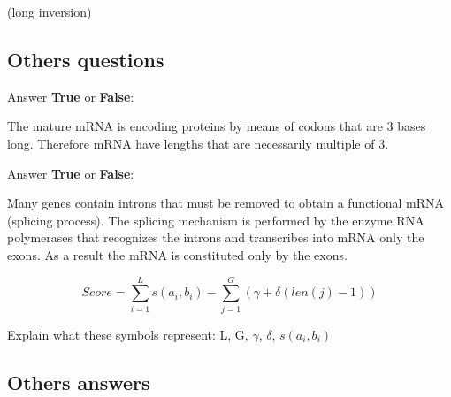 \begin{Answer} [
   ref={ex19},
   number={19}
 ]

   (long inversion)

\end{Answer}

\subsection{Others questions}

\begin{Exercise} [
  title={mRNA},
  difficulty={1},
  label={ex20},
  origin={G. Valle}
 ]

Answer \textbf{True} or \textbf{False}:

  \Question The mature mRNA is encoding proteins by means of codons that are
3 bases long. Therefore mRNA have lengths that are necessarily multiple of 3.

\end{Exercise}

\begin{Exercise} [
  title={Splicing},
  difficulty={1},
  label={ex21},
  origin={G. Valle}
 ]

Answer \textbf{True} or \textbf{False}:

  \Question Many genes contain introns that must be removed to obtain a
functional mRNA (splicing process).
The splicing mechanism is performed by the enzyme RNA polymerases that
recognizes the introns and transcribes into mRNA only the exons.
As a result the mRNA is constituted only by the exons.

\end{Exercise}

\begin{Exercise} [
  title={Objective function for alignment},
  difficulty={1},
  label={ex22},
  origin={G. Valle}
 ]

\begin{equation}
Score = \sum_{i=1}^{L} s(a_i,b_i) - \sum_{j=1}^{G} (\gamma + \delta(len(j)-1))
\end{equation}

  \Question Explain what these symbols represent: L, G, $\gamma$, $\delta$,
$s(a_i,b_i)$

\end{Exercise}

\subsection{Others answers}


